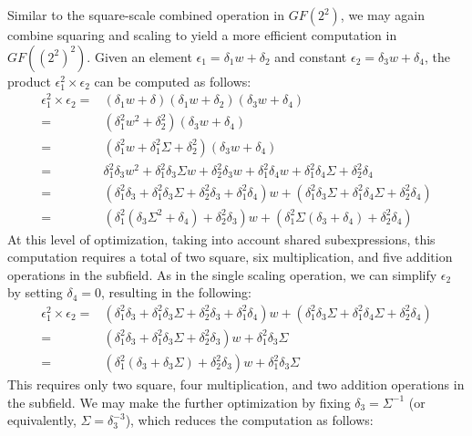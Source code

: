Similar to the square-scale combined operation in $GF(2^2)$, we may again combine squaring and scaling to yield a more efficient computation in $GF((2^2)^2)$. Given an element $\epsilon_1 = \delta_1 w + \delta_2$ and constant $\epsilon_2 = \delta_3 w + \delta_4$, the product $\epsilon_1^2 \times \epsilon_2$ can be computed as follows:
\begin{align*}
\epsilon_1^2 \times \epsilon_2 = & (\delta_1 w + \delta)(\delta_1 w + \delta_2)(\delta_3 w + \delta_4) \\
= & (\delta_1^2 w^2 + \delta_2^2)(\delta_3 w + \delta_4) \\
= & (\delta_1^2 w + \delta_1^2\Sigma + \delta_2^2)(\delta_3 w + \delta_4) \\
= & \delta_1^2\delta_3w^2 + \delta_1^2\delta_3\Sigma w + \delta_2^2\delta_3 w + \delta_1^2\delta_4 w + \delta_1^2\delta_4\Sigma + \delta_2^2\delta_4 \\
= & (\delta_1^2\delta_3 +\delta_1^2\delta_3\Sigma + \delta_2^2\delta_3 + \delta_1^2\delta_4) w + (\delta_1^2\delta_3\Sigma + \delta_1^2\delta_4\Sigma + \delta_2^2\delta_4) \\
= & (\delta_1^2(\delta_3\Sigma^2 + \delta_4) + \delta_2^2\delta_3) w + (\delta_1^2\Sigma(\delta_3 + \delta_4) + \delta_2^2\delta_4) 
\end{align*}
At this level of optimization, taking into account shared subexpressions, this computation requires a total of two square, six multiplication, and five addition operations in the subfield. As in the single scaling operation, we can simplify $\epsilon_2$ by setting $\delta_4 = 0$, resulting in the following:
\begin{align*}
\epsilon_1^2 \times \epsilon_2 = & (\delta_1^2\delta_3 +\delta_1^2\delta_3\Sigma + \delta_2^2\delta_3 + \delta_1^2\delta_4) w + (\delta_1^2\delta_3\Sigma + \delta_1^2\delta_4\Sigma + \delta_2^2\delta_4) \\
= & (\delta_1^2\delta_3 + \delta_1^2\delta_3\Sigma + \delta_2^2\delta_3)w + \delta_1^2\delta_3\Sigma \\
= & (\delta_1^2(\delta_3 + \delta_3\Sigma) + \delta_2^2\delta_3)w + \delta_1^2\delta_3\Sigma
\end{align*}
This requires only two square, four multiplication, and two addition operations in the subfield. We may make the further optimization by fixing $\delta_3 = \Sigma^{-1}$ (or equivalently, $\Sigma = \delta_3^{-3}$), which reduces the computation as follows:

